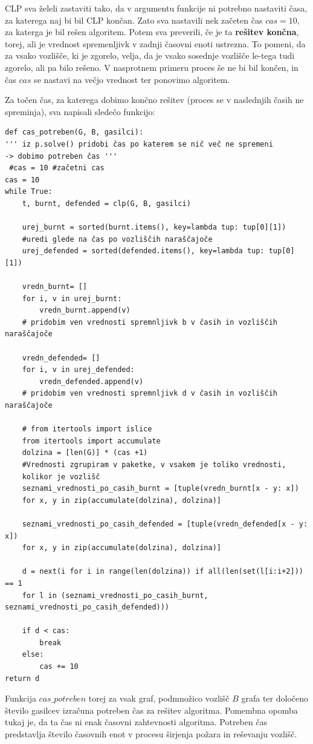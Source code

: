 \documentclass[a4paper, 12pt]{article}
\begin{document}
CLP sva želeli zastaviti tako, da v argumentu funkcije ni potrebno nastaviti časa,
za katerega naj bi bil CLP končan. Zato sva nastavili nek začeten čas $cas = 10,$ za katerga 
je bil rešen algoritem. Potem sva preverili, če je ta \textbf{rešitev končna}, 
torej, ali je vrednost spremenljivk v zadnji časovni enoti ustrezna.
To pomeni, da za vsako vozlišče, ki je zgorelo, velja, da je vsako sosednje
vozlišče le-tega tudi zgorelo, ali pa bilo rešeno. V nasprotnem primeru 
proces še ne bi bil končen, in čas $cas$ se nastavi na večjo vrednost ter
ponovimo algoritem. \pagebreak

Za točen čas, za katerega dobimo končno rešitev (proces se v naslednjih časih ne spreminja),
sva napisali sledečo funkcijo:
\begin{verbatim}
def cas_potreben(G, B, gasilci):
''' iz p.solve() pridobi čas po katerem se nič več ne spremeni 
-> dobimo potreben čas '''
 #cas = 10 #začetni cas
cas = 10
while True:
    t, burnt, defended = clp(G, B, gasilci)

    urej_burnt = sorted(burnt.items(), key=lambda tup: tup[0][1])
    #uredi glede na čas po vozliščih naraščajoče
    urej_defended = sorted(defended.items(), key=lambda tup: tup[0][1]) 

    vredn_burnt= []
    for i, v in urej_burnt:
        vredn_burnt.append(v)
    # pridobim ven vrednosti spremnljivk b v časih in vozliščih naraščajoče

    vredn_defended= []
    for i, v in urej_defended:
        vredn_defended.append(v)
    # pridobim ven vrednosti spremnljivk d v časih in vozliščih naraščajoče

    # from itertools import islice
    from itertools import accumulate
    dolzina = [len(G)] * (cas +1) 
    #Vrednosti zgrupiram v paketke, v vsakem je toliko vrednosti, 
    kolikor je vozlišč
    seznami_vrednosti_po_casih_burnt = [tuple(vredn_burnt[x - y: x]) 
    for x, y in zip(accumulate(dolzina), dolzina)]

    seznami_vrednosti_po_casih_defended = [tuple(vredn_defended[x - y: x]) 
    for x, y in zip(accumulate(dolzina), dolzina)]

    d = next(i for i in range(len(dolzina)) if all(len(set(l[i:i+2])) == 1 
    for l in (seznami_vrednosti_po_casih_burnt, seznami_vrednosti_po_casih_defended)))
        
    if d < cas:
        break
    else:
        cas += 10
return d
\end{verbatim}
Funkcija $cas\_potreben$ torej za vsak graf, podmnožico vozlišč $B$ grafa ter določeno število gasilcev
izračuna potreben čas za rešitev algoritma. Pomembna opomba tukaj je, da ta čas ni enak časovni zahtevnosti
algoritma. Potreben čas predstavlja število časovnih enot v procesu širjenja požara in reševanju vozlišč.
\end{document}
